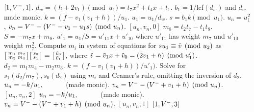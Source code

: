 \begin{subroutine}[htbp]
\caption{Genus 3 Split Model Degree 3 Doubling ($d = 0$) \label{sub:g3explSPLIT3DBLd}}
\begin{algorithmic} [1]
     \hspace{1pt} \Return $[1,V^{-},1]$.
    \Else \hspace{2pt} $d_w =  (h + 2v_1) \pmod{u_1} = t_7x^2 + t_4x + t_1.$
        \State $b_1 = 1/$lcf$(d_w)$ and $d_w$ made monic.
        \State $k = (f - v_1(v_1 + h))/u_1$.
        \State $u_1 = u_1/d_w$.
        \State $s = b_1k \pmod{u_1}$.
        \State $u_n = u_1^2$, $v_n = V^{-} - (V^{-} - v_1 - u_1s) \pmod{u_n}$.
        \State \Return $[u_n,v_n,0]$
    \EndIf
\Else \hspace{2pt} $m_8 = t_2t_7 - t_1t_8$. 
    \State $S = -m_7x + m_8$.
    \State $u'_1 = u_1/S = u'_{11}x + u'_{10}$ where $u'_{11}$ has weight $m_7$ and $u'_{10}$ weight $m_7^2$.        
    \State Compute $m_i$ in system of equations for $su_1\equiv \tilde{v} \pmod{u_2}$ as $ \bigl[ \begin{smallmatrix} m_1 & m_2\\ m_3 & m_4\end{smallmatrix}\bigr] \bigl[ \begin{smallmatrix} s_0\\ s_1 \end{smallmatrix} \bigr ] = \bigl[ \begin{smallmatrix}\tilde{v}_0 \\  \tilde{v}_1\end{smallmatrix} \bigr ]$,
    \Statex \hspace{18pt}  where $\tilde{v} = \tilde{v}_1x + \tilde{v}_0 = (2v_1 + h) \pmod{u'_1}$.
    \State $d_2 = m_1m_4 - m_2m_3$.  
    \State $k = (f - v_1(v_1 + h))/u'_1)$.
    \State Solve for $s_1(d_2/m_7), s_0(d_2)$ using $m_i$ and Cramer's rule, omitting the inversion of $d_2$.
             \hspace{2pt} $u_n = -k/u_1, \quad\quad\quad$ (made monic).
                \State $v_n = V^{-} - (V^{-} + v_1 + h) \pmod{u_n}$.
                \State \Return $[u_n,v_n,2]$
            \Else \hspace{2pt} $u_n = -k/u_1, \quad\quad\quad$ (made monic).
                \State $v_n = V^{-} - (V^{-} + v_1 + h) \pmod{u_n}$.
                \State \Return $[u_n,v_n,1]$
            \EndIf
        \Else
                 \Return $[1,V^{-},3]$

\end{algorithmic}
\end{subroutine}
